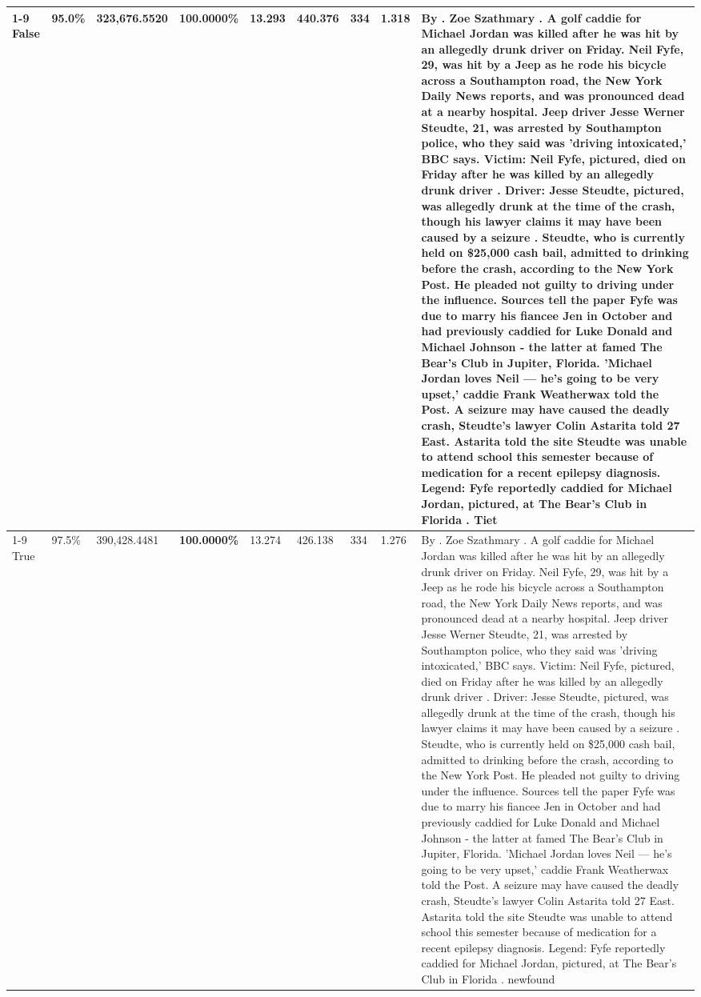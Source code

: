 \begin{table}[H]
\begin{tabular}{lllrlllll}
\cline{1-9}
False & 95.0\% & 323,676.5520 & \bfseries \color{red} 100.0000\% & 13.293 & 440.376 & 334 & 1.318 & By . Zoe Szathmary . A golf caddie for Michael Jordan was killed after he was hit by an allegedly drunk driver on Friday. Neil Fyfe, 29, was hit by a Jeep as he rode his bicycle across a Southampton road, the New York Daily News reports, and was pronounced dead at a nearby hospital. Jeep driver Jesse Werner Steudte, 21, was arrested by Southampton police, who they said was 'driving intoxicated,' BBC says. Victim: Neil Fyfe, pictured, died on Friday after he was killed by an allegedly drunk driver . Driver: Jesse Steudte, pictured, was allegedly drunk at the time of the crash, though his lawyer claims it may have been caused by a seizure . Steudte, who is currently held on \$25,000 cash bail, admitted to drinking before the crash, according to the New York Post. He pleaded not guilty to driving under the influence. Sources tell the paper Fyfe was due to marry his fiancee Jen in October and had previously caddied for Luke Donald and Michael Johnson - the latter at famed The Bear's Club in Jupiter, Florida. 'Michael Jordan loves Neil — he’s going to be very upset,' caddie Frank Weatherwax told the Post. A seizure may have caused the deadly crash, Steudte's lawyer Colin Astarita told 27 East. Astarita told the site Steudte was unable to attend school this semester because of medication for a recent epilepsy diagnosis. Legend: Fyfe reportedly caddied for Michael Jordan, pictured, at The Bear's Club in Florida . Tiet \\
\cline{1-9}
True & 97.5\% & 390,428.4481 & \bfseries \color{red} 100.0000\% & 13.274 & 426.138 & 334 & 1.276 & By . Zoe Szathmary . A golf caddie for Michael Jordan was killed after he was hit by an allegedly drunk driver on Friday. Neil Fyfe, 29, was hit by a Jeep as he rode his bicycle across a Southampton road, the New York Daily News reports, and was pronounced dead at a nearby hospital. Jeep driver Jesse Werner Steudte, 21, was arrested by Southampton police, who they said was 'driving intoxicated,' BBC says. Victim: Neil Fyfe, pictured, died on Friday after he was killed by an allegedly drunk driver . Driver: Jesse Steudte, pictured, was allegedly drunk at the time of the crash, though his lawyer claims it may have been caused by a seizure . Steudte, who is currently held on \$25,000 cash bail, admitted to drinking before the crash, according to the New York Post. He pleaded not guilty to driving under the influence. Sources tell the paper Fyfe was due to marry his fiancee Jen in October and had previously caddied for Luke Donald and Michael Johnson - the latter at famed The Bear's Club in Jupiter, Florida. 'Michael Jordan loves Neil — he’s going to be very upset,' caddie Frank Weatherwax told the Post. A seizure may have caused the deadly crash, Steudte's lawyer Colin Astarita told 27 East. Astarita told the site Steudte was unable to attend school this semester because of medication for a recent epilepsy diagnosis. Legend: Fyfe reportedly caddied for Michael Jordan, pictured, at The Bear's Club in Florida . newfound \\

\end{tabular}
\end{table}
